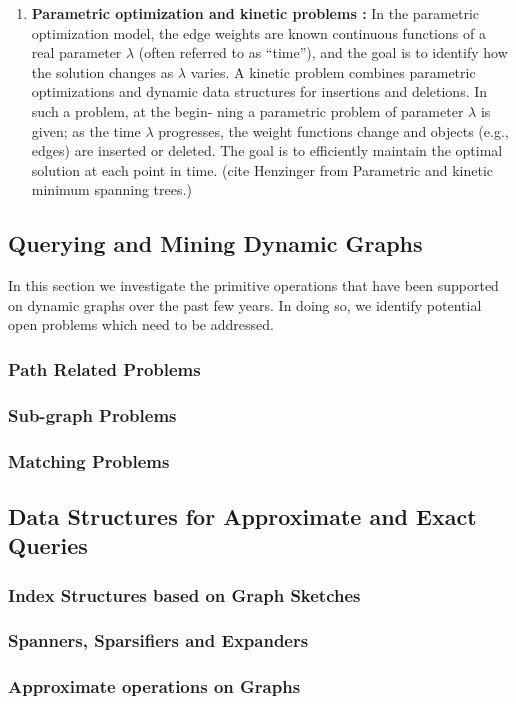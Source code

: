 \begin{enumerate}
	\item {\textbf{Parametric optimization and kinetic problems :}} In the parametric optimization model, the edge weights are known continuous functions of a real parameter $\lambda$ (often referred to as “time”), and the goal is to identify how the solution changes as $\lambda$ varies. A kinetic problem combines parametric optimizations and dynamic data structures for insertions and deletions. In such a problem, at the begin- ning a parametric problem of parameter $\lambda$ is given; as the time $\lambda$ progresses, the weight functions change and objects (e.g., edges) are inserted or deleted. The goal is to efficiently maintain the optimal solution at each point in time.
(cite Henzinger from Parametric and kinetic minimum spanning trees.)


\end{enumerate}



\subsection{Querying and Mining Dynamic Graphs}
\label{sec:query-mining}

In this section we investigate the primitive operations that have been supported on dynamic graphs over the past few years. In doing so, we identify potential open problems which need to be addressed. 


\subsubsection{Path Related Problems} 
\label{sec:path-problems}


\subsubsection{Sub-graph Problems}
\label{sec:subgraph-problems}


\subsubsection{Matching Problems}
\label{sec:matching-problems}


\subsection{Data Structures for Approximate and Exact Queries}
\label{sec:approx-exacts}

\subsubsection{Index Structures based on Graph Sketches}
\label{sec:indexing-dynamic-graphs}

\subsubsection{Spanners, Sparsifiers and Expanders}
\label{sec:spanners}

\subsubsection{Approximate operations on Graphs}
\label{sec:approximate-problems}


